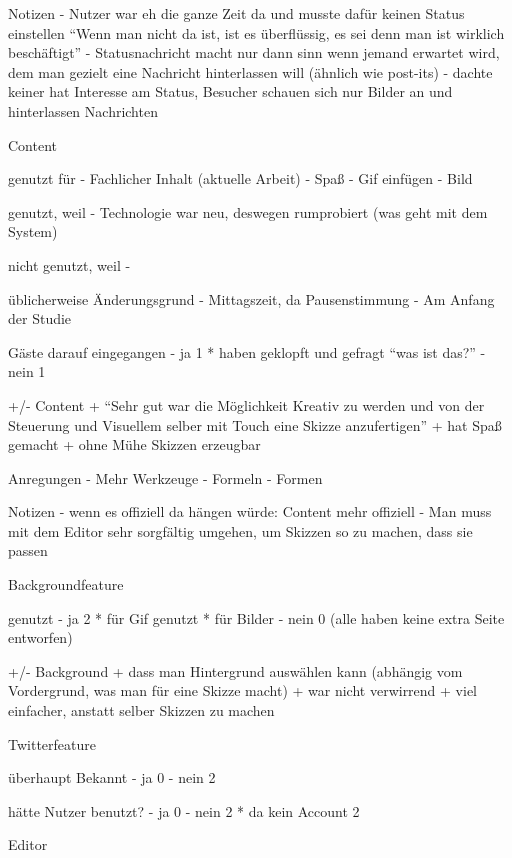 Notizen
- Nutzer war eh die ganze Zeit da und musste dafür keinen Status einstellen
  ``Wenn man nicht da ist, ist es überflüssig, es sei denn man ist wirklich beschäftigt''
- Statusnachricht macht nur dann sinn wenn jemand erwartet wird, dem man gezielt eine Nachricht hinterlassen will (ähnlich wie post-its)
- dachte keiner hat Interesse am Status, Besucher schauen sich nur Bilder an und hinterlassen Nachrichten

Content

genutzt für
- Fachlicher Inhalt (aktuelle Arbeit)
- Spaß
- Gif einfügen
- Bild

genutzt, weil
- Technologie war neu, deswegen rumprobiert (was geht mit dem System)

nicht genutzt, weil
-

üblicherweise Änderungsgrund
- Mittagszeit, da Pausenstimmung
- Am Anfang der Studie

Gäste darauf eingegangen
- ja 1
  * haben geklopft und gefragt ``was ist das?''
- nein 1

+/- Content
+ ``Sehr gut war die Möglichkeit Kreativ zu werden und von der Steuerung und Visuellem selber mit Touch eine Skizze anzufertigen''
+ hat Spaß gemacht
+ ohne Mühe Skizzen erzeugbar

Anregungen
- Mehr Werkzeuge
- Formeln
- Formen

Notizen
- wenn es offiziell da hängen würde: Content mehr offiziell
- Man muss mit dem Editor sehr sorgfältig umgehen, um Skizzen so zu machen, dass sie passen

Backgroundfeature

genutzt
- ja 2
  * für Gif genutzt
  * für Bilder
- nein 0
(alle haben keine extra Seite entworfen)

+/- Background
+ dass man Hintergrund auswählen kann (abhängig vom Vordergrund, was man für eine Skizze macht)
+ war nicht verwirrend
+ viel einfacher, anstatt selber Skizzen zu machen

Twitterfeature

überhaupt Bekannt
- ja 0
- nein 2

hätte Nutzer benutzt?
- ja 0
- nein 2
  * da kein Account 2


Editor

